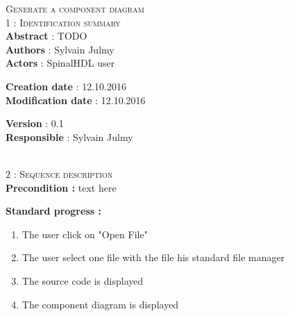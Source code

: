 \begin{flushleft}
    \textsc{\huge Generate a component diagram}\\[0.5cm]

    \BlackLine
    \textsc{\Large 1 : Identification summary}\\[0.3cm]

        \textbf{\large Abstract} : TODO \\[0.1cm]

        \textbf{\large Authors} : Sylvain Julmy \\[0.3cm]			

        \textbf{\large Actors} : SpinalHDL user \\[0.1cm]	
    \begin{minipage}{0.40\textwidth}
        \begin{flushleft}	
            \textbf{\large Creation date} : 12.10.2016 \\[0.1cm]

            \textbf{\large Modification date} : 12.10.2016 \\[0.1cm]
        \end{flushleft}
    \end{minipage}
    \begin{minipage}{0.40\textwidth}
        \begin{flushleft}
            \textbf{\large Version} : 0.1 \\[0.1cm]

            \textbf{\large Responsible} : Sylvain Julmy \\[0.1cm]
        \end{flushleft}
    \end{minipage}
    \\[0.5cm]
    \BlackLine
    \textsc{\Large 2 : Sequence description}\\[0.3cm]

    \textbf{\large Precondition :} text here

    \textbf{\large  Standard progress :}
    \begin{enumerate}[nosep]
        \item The user click on "Open File"
        \item The user select one file with the file his standard file manager
        \item The source code is displayed
        \item The component diagram is displayed
    \end{enumerate}


\end{flushleft}

